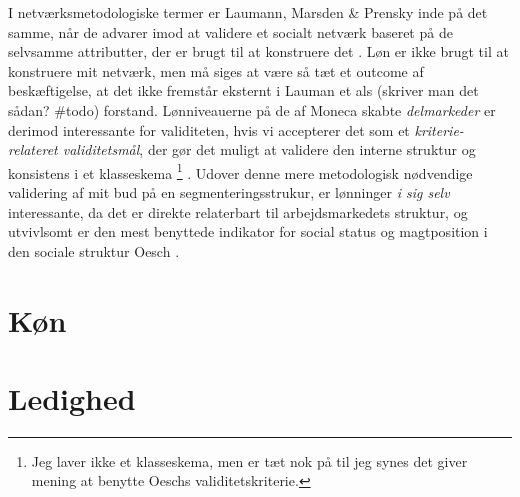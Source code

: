 I netværksmetodologiske termer er Laumann, Marsden \& Prensky inde på det samme, når de advarer imod at validere et socialt netværk baseret på de selvsamme attributter, der er brugt til at konstruere det \parencite[29]{Laumann1983}. Løn er ikke brugt til at konstruere mit netværk, men må siges at være så tæt et outcome af beskæftigelse, at det ikke fremstår eksternt i Lauman et als (skriver man det sådan? \#todo) forstand. Lønniveauerne på de af Moneca skabte \emph{delmarkeder} er derimod interessante for validiteten, hvis vi accepterer det som et \emph{kriterie-relateret validitetsmål}, der gør det muligt at validere den interne struktur og konsistens i et klasseskema \parencite[94]{Oesch2006a}%
%
\footnote{ Jeg laver ikke et klasseskema, men er tæt nok på til jeg synes det giver mening at benytte Oeschs validitetskriterie.}%
%
. Udover denne mere metodologisk nødvendige validering af mit bud på en segmenteringsstrukur, er lønninger \emph{i sig selv} interessante, da det er direkte relaterbart til arbejdsmarkedets struktur, og utvivlsomt er den mest benyttede indikator for social status og magtposition i den sociale struktur Oesch \parencite[95]{Oesch2006a}. %





\section{Køn}


\section{Ledighed}


